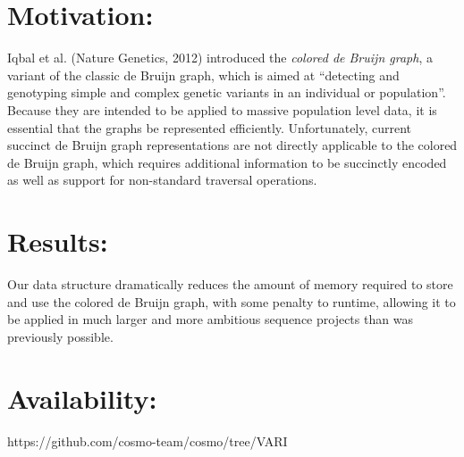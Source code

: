 




  \section{Motivation:}
  Iqbal et al. (Nature Genetics, 2012) introduced the {\em colored de Bruijn graph}, a variant of the classic de Bruijn graph, which is aimed at ``detecting and genotyping simple and complex genetic variants in an individual or population''.
Because they are intended to be applied to massive population level data, it is essential that the graphs be represented efficiently.
Unfortunately, current succinct de Bruijn graph representations are not directly applicable to the colored de Bruijn graph, which requires additional information to be succinctly encoded as well as support for non-standard traversal operations.
\section{Results:}
Our data structure dramatically reduces the amount of memory required to store and use the colored de Bruijn graph, with some penalty to runtime, allowing it to be applied in much larger and more ambitious sequence projects than was previously possible.
\section{Availability:} https://github.com/cosmo-team/cosmo/tree/VARI
